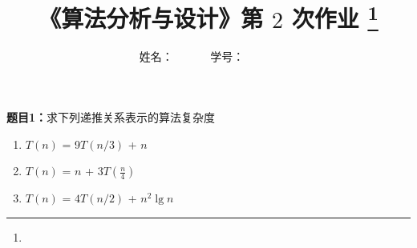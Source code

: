 \documentclass[12pt,a4paper]{article}
\begin{document}
\title{
{\heiti《算法分析与设计》第 {$2$} 次作业
\footnote{

}
}
}
\date{}

\author{
姓名：\underline{}~~~~~~
学号：\underline{}~~~~~~}

\maketitle

\noindent
\section*{\heiti \color{red}{算法分析题}}
\noindent
{\bf 题目1：}求下列递推关系表示的算法复杂度
\begin{enumerate}
\item[(1)]  $T(n)$ = 9$T(n/3)$ + $n$
\item[(2)] $T(n)$ = $n$ + $3T(\frac{n}{4})$
\item[(3)] $T(n)$ = $4T(n/2)$ + $n^2\lg{n}$
\end{enumerate}
\end{document}

